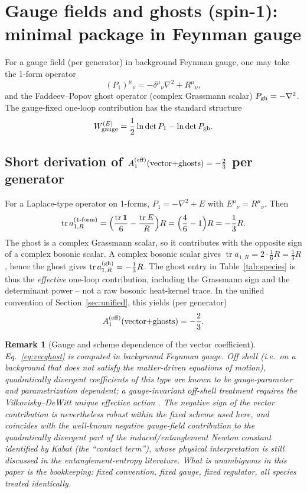 \documentclass[11pt]{article}
\newtheorem{remark}{Remark}
\newcommand{\tr}{\operatorname{tr}}
\begin{document}
\section{Gauge fields and ghosts (spin-1): minimal package in Feynman gauge}
For a gauge field (per generator) in background Feynman gauge, one may take
the 1-form operator
\[
(P_1)^\mu{}_\nu = -\delta^\mu{}_\nu \nabla^2 + R^\mu{}_\nu,
\]
and the Faddeev--Popov ghost operator (complex Grassmann scalar)
$P_{\rm gh} = -\nabla^2$. The gauge-fixed one-loop contribution has the
standard structure
\[
W^{(E)}_{\rm gauge} = \frac{1}{2}\ln\det P_1 - \ln\det P_{\rm gh}.
\]

\subsection{Short derivation of $A_1^{\rm (eff)}(\text{vector+ghosts}) = -\tfrac23$ per generator}
For a Laplace-type operator on 1-forms, $P_1 = -\nabla^2 + E$ with
$E^\mu{}_\nu = R^\mu{}_\nu$. Then
\[
\tr a_{1,R}^{(\text{1-form})}
= \Bigl( \frac{\tr\mathbf{1}}{6} - \frac{\tr E}{R} \Bigr) R
= \Bigl( \frac{4}{6} - 1 \Bigr) R = -\frac{1}{3}R.
\]
The ghost is a complex Grassmann scalar, so it contributes with the opposite
sign of a complex bosonic scalar. A complex bosonic scalar gives
$\tr a_{1,R} = 2\cdot\tfrac16 R = \tfrac13 R$, hence the ghost gives
$\tr a_{1,R}^{\rm (gh)} = -\tfrac13 R$. The ghost entry in
Table~\ref{tab:species} is thus the \emph{effective} one-loop
contribution, including the Grassmann sign and the determinant power --
not a raw bosonic heat-kernel trace. In the unified convention of
Section~\ref{sec:unified}, this yields (per generator)
\begin{equation}
A_1^{\rm (eff)}(\text{vector+ghosts}) = -\frac{2}{3}.
\label{eq:vecghost}
\end{equation}

\begin{remark}[Gauge and scheme dependence of the vector coefficient]
\label{rem:gauge}
Eq.~\eqref{eq:vecghost} is computed in background Feynman gauge. Off shell
(i.e.\ on a background that does not satisfy the matter-driven equations of
motion), quadratically divergent coefficients of this type are known to be
gauge-parameter and parametrization dependent; a gauge-invariant off-shell
treatment requires the Vilkovisky--DeWitt unique effective action
\cite{BV,Vilk}. The negative sign of the vector contribution is nevertheless
robust within the fixed scheme used here, and coincides with the well-known
negative gauge-field contribution to the quadratically divergent part of the
induced/entanglement Newton constant identified by Kabat \cite{Kabat} (the
``contact term''), whose physical interpretation is still discussed in the
entanglement-entropy literature. What is unambiguous in this paper is the
bookkeeping: fixed convention, fixed gauge, fixed regulator, all species
treated identically.
\end{remark}
\end{document}

